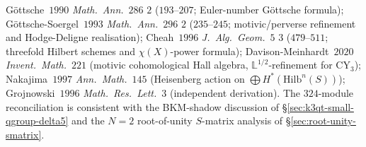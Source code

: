 \begin{remark}
\label{rem:k3qt-gottsche-primary}
Göttsche~$1990$ \emph{Math.~Ann.}~$286$ \textnumero $2$ ($193$--$207$;
Euler-number Göttsche formula); Göttsche-Soergel~$1993$
\emph{Math.~Ann.}~$296$ \textnumero $2$ ($235$--$245$;
motivic/perverse refinement and Hodge-Deligne realisation);
Cheah~$1996$ \emph{J.\ Alg.\ Geom.}~$5$ \textnumero $3$ ($479$--$511$;
threefold Hilbert schemes and $\chi(X)$-power formula);
Davison-Meinhardt~$2020$ \emph{Invent.\ Math.}~$221$ (motivic
cohomological Hall algebra, $\mathbb L^{1/2}$-refinement for
CY$_3$); Nakajima~$1997$ \emph{Ann.\ Math.}~$145$ (Heisenberg
action on $\bigoplus H^*(\mathrm{Hilb}^n(S))$);
Grojnowski~$1996$ \emph{Math.\ Res.\ Lett.}~$3$ (independent
derivation). The $324$-module reconciliation is consistent with
the BKM-shadow discussion of
\S\ref{sec:k3qt-small-qgroup-delta5} and
the $N = 2$ root-of-unity $S$-matrix analysis of
\S\ref{sec:root-unity-smatrix}.
\end{remark}

